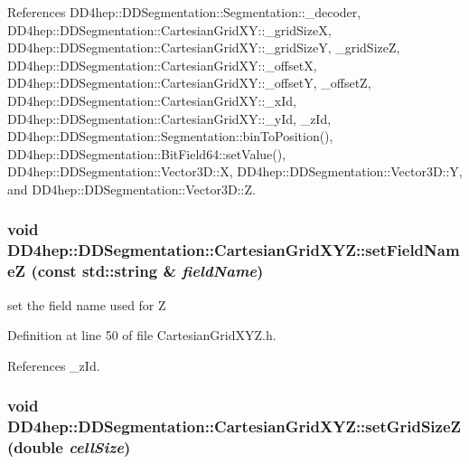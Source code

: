 References DD4hep::DDSegmentation::Segmentation::\_\-decoder, DD4hep::DDSegmentation::CartesianGridXY::\_\-gridSizeX, DD4hep::DDSegmentation::CartesianGridXY::\_\-gridSizeY, \_\-gridSizeZ, DD4hep::DDSegmentation::CartesianGridXY::\_\-offsetX, DD4hep::DDSegmentation::CartesianGridXY::\_\-offsetY, \_\-offsetZ, DD4hep::DDSegmentation::CartesianGridXY::\_\-xId, DD4hep::DDSegmentation::CartesianGridXY::\_\-yId, \_\-zId, DD4hep::DDSegmentation::Segmentation::binToPosition(), DD4hep::DDSegmentation::BitField64::setValue(), DD4hep::DDSegmentation::Vector3D::X, DD4hep::DDSegmentation::Vector3D::Y, and DD4hep::DDSegmentation::Vector3D::Z.\hypertarget{class_d_d4hep_1_1_d_d_segmentation_1_1_cartesian_grid_x_y_z_a80a938d9852e6dcca0b81365b347f6ea}{
\subsubsection[{setFieldNameZ}]{\setlength{\rightskip}{0pt plus 5cm}void DD4hep::DDSegmentation::CartesianGridXYZ::setFieldNameZ (const std::string \& {\em fieldName})}}
\label{class_d_d4hep_1_1_d_d_segmentation_1_1_cartesian_grid_x_y_z_a80a938d9852e6dcca0b81365b347f6ea}


set the field name used for Z 

Definition at line 50 of file CartesianGridXYZ.h.

References \_\-zId.\hypertarget{class_d_d4hep_1_1_d_d_segmentation_1_1_cartesian_grid_x_y_z_a1350853bf74f0de0d12b1fa1bf9c1f09}{
\subsubsection[{setGridSizeZ}]{\setlength{\rightskip}{0pt plus 5cm}void DD4hep::DDSegmentation::CartesianGridXYZ::setGridSizeZ (double {\em cellSize})}}
\label{class_d_d4hep_1_1_d_d_segmentation_1_1_cartesian_grid_x_y_z_a1350853bf74f0de0d12b1fa1bf9c1f09}


